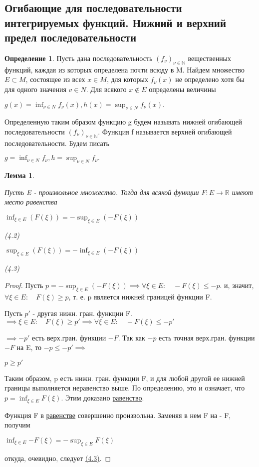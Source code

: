 \documentclass[a4paper]{article}
\newtheorem{lemma}{Лемма}[section]
\theoremstyle{definition}
\newtheorem*{definition}{Определение}
\theoremstyle{remark}
\begin{document}
    \subsection{Огибающие для последовательности интегрируемых функций. Нижний и верхний предел последовательности}
     \begin{definition}
          Пусть дана последовательность $(f_\nu)_{\nu\in \mathbb{N}}$ вещественных функций, 
          каждая из которых определена почти всюду в M. Найдем множество 
          $E \subset M$, состоящее из всех $x \in M$, для которых $f_\nu(x)$ не определено 
          хотя бы для одного значения $v \in N$. Для всякого $x \notin E$ определены 
          величины 

          $g(x) = \inf_{\nu \in N}{f_\nu(x)}, h(x) =\sup_{\nu \in N}{f_\nu(x)}.$ 

          Определенную таким образом функцию g будем называть нижней 
          огибающей последовательности $(f_\nu)_{\nu\in \mathbb{N}}$. Функция f называется  
          верхней огибающей последовательности. Будем писать 

          $g = \inf_{\nu \in N}{f_\nu}, h =\sup_{\nu \in N}{f_\nu}.$ 
     \end{definition}
     \begin{lemma} \hypertarget{l4.2}{}
          Пусть E - произвольное множество. Тогда для  
          всякой функции $F: E \to \mathbb{R}$ имеют место равенства

          \hypertarget{4.2}{$\inf_{\xi \in E}({F(\xi)}) = -\sup_{\xi \in E}({-F(\xi)})$ } (4.2)

          \hypertarget{4.3}{$\sup_{\xi \in E}({F(\xi)}) = -\inf_{\xi \in E}({-F(\xi)})$ } (4.3)
     \end{lemma}
     \begin{proof}
          Пусть $p = -\sup_{\xi \in E}(-F(\xi)) \implies \forall \xi \in E: \quad -F(\xi) \leq -p$.
          и, значит, $\forall\xi \in E: \quad F(\xi) \geq p$, т. е. 
          p является нижней границей функции F. 

          Пусть $p'$ - другая нижн. гран. функции F.  
          $\implies \xi \in E: \quad F(\xi) \geq p'\implies \forall \xi \in E: \quad -F(\xi) \leq -p'$

          $\implies-p'$ есть верх.гран.  
          функции $-F$. Так как $-p$ есть точная верх.гран. функции $-F$ на E, 
          то $-p \leq -p'\implies$ 

          \hypertarget{4.4}{$p \geq p'$}

          Таким образом, p есть нижн. гран. функции F, и для любой 
          другой ее нижней границы выполняется неравенство выше. По  
          определению, это и означает, что $p = \inf_{\xi \in E} F(\xi)$. 
          Этим доказано \hyperlink{4.2}{равенство}.

          Функция F в \hyperlink{4.2}{равенстве} совершенно произвольна.
          Заменяя в нем 
          F на - F, получим 

          $\inf_{\xi \in E}{-F(\xi)} = - \sup_{\xi \in E}{F(\xi)}$

          откуда, очевидно, следует \hyperlink{4.3}{(4.3)}. 
     \end{proof}
\end{document}
